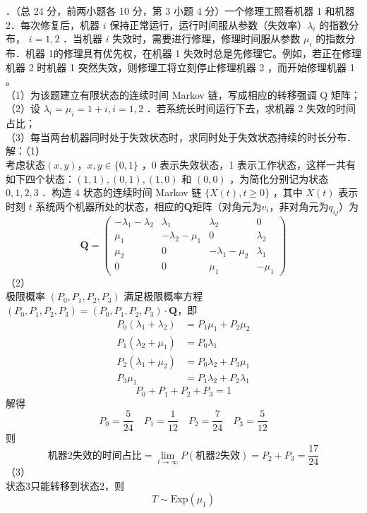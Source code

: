 \documentclass[UTF8]{ctexart}
\begin{document}
．（总 24 分，前两小题各 10 分，第 3 小题 4 分）一个修理工照看机器 1 和机器\\
2．每次修复后，机器 $i$ 保持正常运行，运行时间服从参数（失效率）$\lambda_{i}$ 的指数分布， $i=1,2$ ．当机器 $i$ 失效时，需要进行修理，修理时间服从参数 $\mu_{i}$ 的指数分布．机器 1的修理具有优先权，在机器 1 失效时总是先修理它。例如，若正在修理机器 2 时机器 1 突然失效，则修理工将立刻停止修理机器 2 ，而开始修理机器 1 。\\
（1）为该题建立有限状态的连续时间 Markov 链，写成相应的转移强调 Q 矩阵；\\
（2）设 $\lambda_{i}=\mu_{i}=1+i, i=1,2$ ．若系统长时间运行下去，求机器 2 失效的时间占比；\\
（3）每当两台机器同时处于失效状态时，求同时处于失效状态持续的时长分布．\\
解：（1）\\
考虑状态$(x, y)$，$ x, y \in\{0,1\}$ ，0 表示失效状态，1 表示工作状态，这样一共有如下四个状态：$(1,1),(0,1),(1,0)$ 和 $(0,0)$ ，为简化分别记为状态 $0,1,2,3$ ．构造 4 状态的连续时间 Markov 链 $\{X(t), t \geq 0\}$ ，其中 $X(t)$ 表示时刻 $t$ 系统两个机器所处的状态，相应的$\mathbf{Q}$矩阵（对角元为$v_i$，非对角元为$q_{ij}$）为
$$
\mathbf{Q}=
\begin{pmatrix}
	-\lambda_{1}-\lambda_{2} & \lambda_{1} & \lambda_{2} & 0 \\
	\mu_{1} & -\lambda_{2}-\mu_{1} & 0 & \lambda_{2} \\
	\mu_{2} & 0 & -\lambda_{1}-\mu_{2} & \lambda_{1} \\
	0 & 0 & \mu_{1} & -\mu_{1}
\end{pmatrix}
$$
（2）\\
极限概率 $\left(P_{0}, P_{1}, P_{2}, P_{3}\right)$ 满足极限概率方程$
\left(P_{0}, P_{1}, P_{2}, P_{3}\right)=\left(P_{0}, P_{1}, P_{2}, P_{3}\right) \cdot \mathbf{Q}
$，即\\
$$
\begin{aligned}
	P_0(\lambda_1+\lambda_2)&=P_1\mu_1+P_2\mu_2 \\
	P_1(\lambda_2+\mu_1)&=P_0\lambda_1 \\
	P_2(\lambda_1+\mu_2)&=P_0\lambda_2+P_3\mu_1\\
	P_3\mu_1&=P_1\lambda_2+P_2\lambda_1
\end{aligned}
$$
\[
P_0+P_1+P_2+P_3=1
\]
解得
\[
P_0=\frac{5}{24} \quad P_1=\frac{1}{12} \quad P_2=\frac{7}{24} \quad P_3=\frac{5}{12} 
\]
则
\[
\text{机器2失效的时间占比}= \lim_{t \rightarrow \infty}P(\text{机器2失效})=P_2+P_3=\frac{17}{24}
\]
（3）\\
状态3只能转移到状态2，则\\
\[
T\sim \mathrm{Exp}(\mu_1)
\]\\
\end{document}
